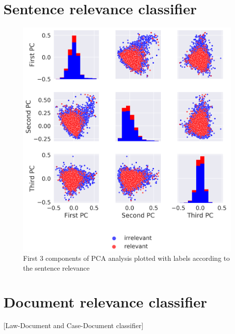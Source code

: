 \documentclass[
  digital, %
  table,   %
  lof,     %
  lot,     %
]{fithesis3}
\begin{document}
\section{Sentence relevance classifier}
\label{sec:sentence-classifier}


\begin{figure}[H]
\caption{First 3 components of PCA analysis plotted with labels according to the sentence relevance}
\label{fig:PCA_sent_relevance}
\includegraphics[width=\textwidth]{img/PCA_sent_relevance}
\end{figure}

\section{Document relevance classifier}
\label{sec:document-classifier}
[Law-Document and Case-Document classifier]
\end{document}
